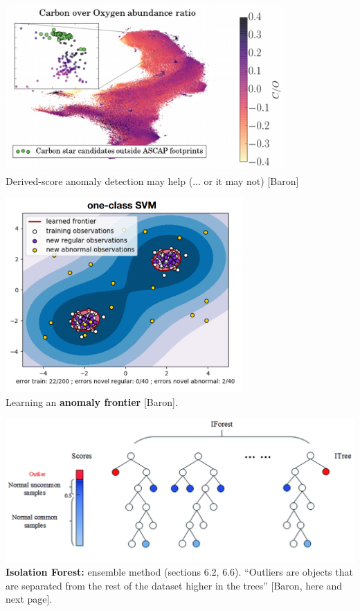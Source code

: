 \documentclass[20pt,landscape,footrule,headrule]{foils}
\begin{document}
\newpage\ 
\begin{center}
\includegraphics[width=0.8\textwidth]{Images/COar.png} \\ 
Derived-score anomaly detection may help (... or it may not) [Baron]
\end{center}

\newpage
\begin{center}
\includegraphics[width=0.68\textwidth]{Images/1SVM.png} \\ 
Learning an \textbf{anomaly frontier} [Baron].
\end{center}


\newpage
\begin{center}
\includegraphics[width=\textwidth]{Images/IsoForest.png} \\ 
\textbf{Isolation Forest:} ensemble method (sections 6.2, 6.6). ``Outliers are objects that are separated from the rest of the dataset higher in the trees'' [Baron, here and next page].
\end{center}
\end{document}
